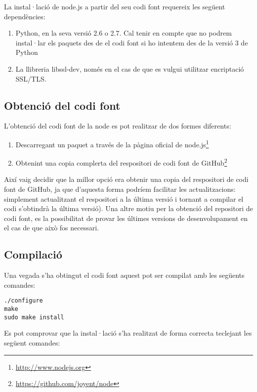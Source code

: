 La instal·lació de node.js a partir del seu codi font requereix les següent dependències:

\begin{enumerate}
    \item{Python, en la seva versió 2.6 o 2.7. Cal tenir en compte que no podrem instal·lar els paquets des de el codi font si ho intentem des de la versió 3 de Python}
    \item{La llibreria libssl-dev, només en el cas de que es vulgui utilitzar encriptació SSL/TLS. }
\end{enumerate}

\subsection{Obtenció del codi font}

L'obtenció del codi font de la node es pot realitzar de dos formes diferents: 

\begin{enumerate}
    \item{Descarregant un paquet a través de la pàgina oficial de node.js\footnote{\url{http://www.nodejs.org}}}
    \item{Obtenint una copia complerta del respositori de codi font de GitHub\footnote{\url{https://github.com/joyent/node}}}
\end{enumerate}

Així vaig decidir que la millor opció era obtenir una copia del respositori de codi font de GitHub, ja que d'aquesta forma podríem facilitar les actualitzacions: simplement actualitzant el respositori a la última versió i tornant a compilar el codi s'obtindrà la última versió). Una altre motiu per la obtenció del repositori de codi font, es la possibilitat de provar les últimes versions de desenvolupament en el cas de que això fos necessari.  

\subsection{Compilació}

Una vegada s'ha obtingut el codi font aquest pot ser compilat amb les següents comandes:  
\begin{verbatim}
./configure
make
sudo make install
\end{verbatim}

Es pot comprovar que la instal·lació s'ha realitzat de forma correcta teclejant les següent comandes: 

